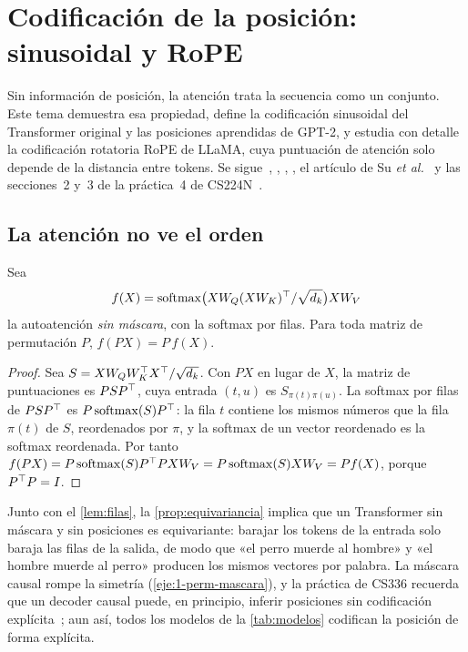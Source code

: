 \chapter{Codificación de la posición: sinusoidal y RoPE}
\label{tema:4}

Sin información de posición, la atención trata la secuencia como un conjunto. Este tema demuestra esa propiedad, define la codificación sinusoidal del Transformer original y las posiciones aprendidas de GPT-2, y estudia con detalle la codificación rotatoria RoPE de LLaMA, cuya puntuación de atención solo depende de la distancia entre tokens. Se sigue~\cite[§3.5]{vaswani}, \cite[§11.6.3]{d2l}, \cite[§12.1.9]{bishopdl}, \cite[§7.4]{jm3}, el artículo de Su \emph{et al.}~\cite[§3.2]{roformer} y las secciones~2 y~3 de la práctica~4 de CS224N~\cite{cs224n}.

\section{La atención no ve el orden}

\begin{proposicion}\label{prop:equivariancia}
Sea
\[
f(X)=\operatorname{softmax}\bigl(XW_Q(XW_K)^{\top}/\sqrt{d_k}\bigr)XW_V
\]
la autoatención \emph{sin máscara}, con la softmax por filas. Para toda matriz de permutación $P$, $f(PX)=P\,f(X)$.
\end{proposicion}

\begin{proof}
Sea $S=XW_QW_K^{\top} X^{\top}/\sqrt{d_k}$. Con $PX$ en lugar de $X$, la matriz de puntuaciones es $PSP^{\top}$, cuya entrada $(t,u)$ es $S_{\pi(t)\pi(u)}$. La softmax por filas de $PSP^{\top}$ es $P\operatorname{softmax}(S)P^{\top}$: la fila $t$ contiene los mismos números que la fila $\pi(t)$ de $S$, reordenados por $\pi$, y la softmax de un vector reordenado es la softmax reordenada. Por tanto $f(PX)=P\operatorname{softmax}(S)P^{\top} PXW_V=P\operatorname{softmax}(S)XW_V=Pf(X)$, porque $P^{\top} P=I$.
\end{proof}

Junto con el \cref{lem:filas}, la \cref{prop:equivariancia} implica que un Transformer sin máscara y sin posiciones es equivariante: barajar los tokens de la entrada solo baraja las filas de la salida, de modo que «el perro muerde al hombre» y «el hombre muerde al perro» producen los mismos vectores por palabra. La máscara causal rompe la simetría (\cref{eje:1-perm-mascara}), y la práctica de CS336 recuerda que un decoder causal puede, en principio, inferir posiciones sin codificación explícita~\cite[§7.3]{cs336}; aun así, todos los modelos de la \cref{tab:modelos} codifican la posición de forma explícita.

